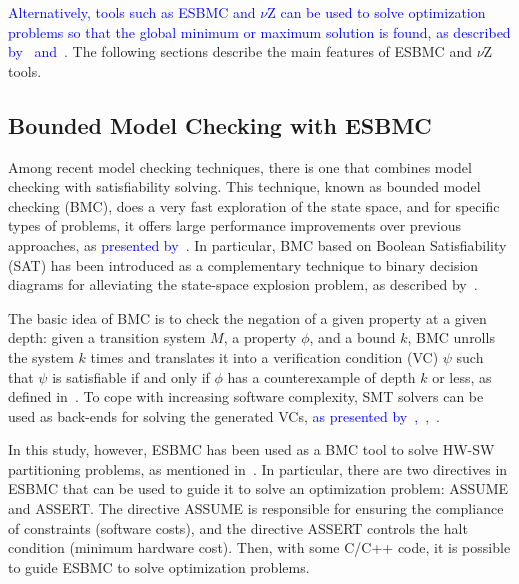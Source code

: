 \documentclass{doublecol-new}
\theoremstyle{TH}{
\newtheorem{lemma}{Lemma}
\newtheorem{theorem}[lemma]{Theorem}
\newtheorem{corrolary}[lemma]{Corrolary}
\newtheorem{conjecture}[lemma]{Conjecture}
\newtheorem{proposition}[lemma]{Proposition}
\newtheorem{claim}[lemma]{Claim}
\newtheorem{stheorem}[lemma]{Wrong Theorem}
\newtheorem{algorithm}{Algorithm}
}
\theoremstyle{THrm}{
\newtheorem{definition}{Definition}[section]
\newtheorem{question}{Question}[section]
\newtheorem{remark}{Remark}
\newtheorem{scheme}{Scheme}
}
\theoremstyle{THhit}{
\newtheorem{case}{Case}[section]
}
\begin{document}
\textcolor{blue}{Alternatively, tools such as ESBMC and $\nu$Z can be used to solve optimization problems so that the global minimum or maximum solution is found, as described by~\cite{Trindade2015} and~\cite{Bjorner2015}}. The following sections describe the main features of ESBMC and $\nu$Z tools.

\subsection{Bounded Model Checking with ESBMC}
\label{Bounded-Model-Checking-with-ESBMC}

Among recent model checking techniques, there is one that combines model checking with satisﬁability solving. This technique, known as bounded model checking (BMC), does a very fast exploration of the state space, and for specific types of problems, it offers large performance improvements over previous approaches, as \textcolor{blue}{presented by}~\cite{Biere2009}. In particular, BMC based on Boolean Satisfiability (SAT) has been introduced as a complementary technique to binary decision diagrams for alleviating the state-space explosion problem, as described by~\cite{Clarke2001}. 

The basic idea of BMC is to check the negation of a given property at a given depth: given a transition system $M$, a property $\phi$, and a bound $k$, BMC unrolls the system $k$ times and translates it into a verification condition (VC) $\psi$  such that $\psi$ is satisfiable if and only if $\phi$ has a counterexample of depth $k$ or less, as defined in~\cite{Biere2009}. To cope with increasing software complexity, SMT solvers can be used as back-ends for solving the generated VCs, \textcolor{blue}{as presented by~\cite{Ganai2006},~\cite{Armando2009},~\cite{Cordeiro2012}}. 

In this study, however, ESBMC has been used as a BMC tool to solve HW-SW partitioning problems, as mentioned in~\cite{Cordeiro2012}. 
In particular, there are two directives in ESBMC that can be used to guide it to solve an optimization problem: ASSUME and ASSERT. The directive ASSUME is responsible for ensuring the compliance of constraints (software costs), and the directive ASSERT controls the halt condition (minimum hardware cost). Then, with some C/C++ code, it is possible to guide ESBMC to solve optimization problems.

\end{document}
